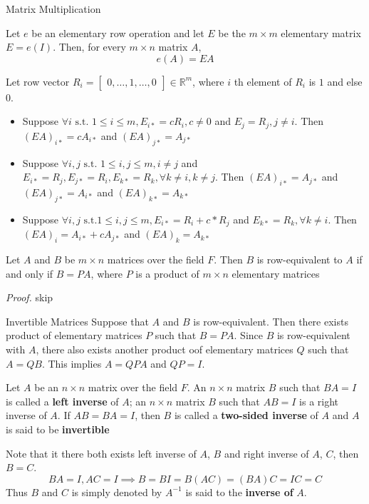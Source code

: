 \documentclass[8pt]{beamer}
\newcommand{\mbb}[1]{\mathbb{#1}}
\newcommand{\tb}[1]{\textbf{#1}}
\newcommand{\ti}[1]{\textit{#1}}
\begin{document}
\begin{frame}{Matrix Multiplication}
  \begin{theorem}
    Let $e$ be an elementary row operation and let $E$ be the $m\times m$ elementary matrix $E = e(I)$. Then, for every $m \times n$ matrix $A$,
    \[
    e(A) = EA
    \]
  
  \end{theorem}
  Let row vector $R_{i} = \left[\begin{matrix}
    0, \dots, 1, \dots, 0
  \end{matrix}\right] \in \mbb{R}^m$, where $i$ th element of $R_i$ is $1$ and else $0$.
  \begin{itemize}
    \item Suppose $\forall i \text{ s.t. } 1 \leq i \leq m, E_{i*}= c R_i, c \neq 0$ and $E_j = R_j, j \neq i$. Then $(EA)_{i*} = cA_{i*}$ and $(EA)_{j*} = A_{j*}$
    \item Suppose $\forall i, j \text{ s.t. } 1 \leq i,j \leq m, i \neq j$ and $E_{i*} = R_j, E_{j*} = R_i, E_{k*} = R_k , \forall k \neq i, k \neq j$. Then $(EA)_{i*} = A_{j*}$ and $(EA)_{j*} = A_{i*}$ and $(EA)_{k*} = A_{k*}$
    \item Suppose $\forall i,j \text{ s.t.} 1 \leq i, j \leq m, E_{i*} = R_i + c * R_j$ and $E_{k*} = R_k, \forall k \neq i$. Then $(EA)_i = A_{i*} + c A_{j*}$ and $(EA)_k = A_{k*}$
  \end{itemize}

  \begin{corollary}
    Let $A$ and $B$ be $m \times n$ matrices over the field $F$. Then $B$ is row-equivalent to $A$ if and only if $B = PA$, where $P$ is a product of $m \times n$ elementary matrices
  \end{corollary}

  \ti{Proof.} skip

\end{frame}


\begin{frame}{Invertible Matrices}
  Suppose that $A$ and $B$ is row-equivalent. Then there exists product of elementary matrices $P$ such that $B = PA$. Since $B$ is row-equivalent with $A$, there also exists another product oof elementary matrices $Q$ such that $A = QB$. This implies $A = QPA$ and $QP = I$.

  \begin{definition}
    Let $A$ be an $n \times n $ matrix over the field $F$. An $n \times n$ matrix $B$ such that $BA = I$ is called a \tb{left inverse} of $A$; an $n \times n$ matrix $B$ such that $AB = I$ is a right inverse of $A$. If $AB = BA = I$, then $B$ is called a \tb{two-sided inverse} of $A$ and $A$ is said to be \tb{invertible}
  \end{definition}

  Note that it there both exists left inverse of $A$, $B$ and right inverse of $A$, $C$, then $B = C$. 
  \[
    BA = I, AC = I \implies B = BI = B(AC) = (BA)C = IC = C
  \]
  Thus $B$ and $C$ is simply denoted by $A^{-1}$ is said to the \tb{inverse of} $A$.
\end{frame}
\end{document}
